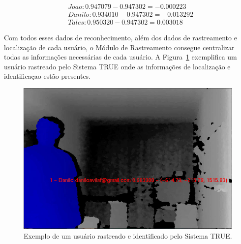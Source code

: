	\begin{align}
	\nonumber & Joao: 0.947079 - 0.947302 = -0.000223\\
		\nonumber & Danilo: 0.934010 - 0.947302 = -0.013292\\
		\nonumber & Tales: 0.950320 - 0.947302 = 0.003018
	\end{align}

	Com todos esses dados de reconhecimento, além dos dados de rastreamento e localização de cada usuário, o Módulo de Rastreamento consegue centralizar todas as informações necessárias de cada usuário. A Figura~\ref{fig:truetotal} exemplifica um usuário rastreado pelo Sistema TRUE onde as informações de localização e identificaçao estão presentes.

	\begin{figure}[htb]
			\begin{center}
				\includegraphics[scale=0.5]{figuras/4.ProblemaEProposta/user-reconhecido.png}
			\end{center}
			\caption{Exemplo de um usuário rastreado e identificado pelo Sistema TRUE.}
			\label{fig:truetotal}
		\end{figure}

